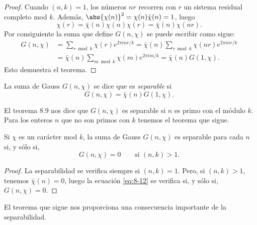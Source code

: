 \documentclass[12pt,a4paper]{book}
\begin{document}
    \begin{proof}
        Cuando $(n,k)=1$, los números $nr$ recorren con $r$ un sistema residual completo
        mod $k$. Además, $\abs{\chi(n)}^{2}=\chi(n)\bar{\chi}(n)=1$, luego
        \begin{equation*}
            \chi(r)=\bar{\chi}(n)\chi(n)\chi(r)=\bar{\chi}(n)\chi(nr).
        \end{equation*}
        Por consiguiente la suma que define $G(n,\chi)$ se puede escribir como sigue:
        \begin{align*}
            G(n,\chi)&=\sum_{r\bmod k}\chi(r)e^{2\pi inr/k}=\bar{\chi}(n)\sum_{r\bmod k}\chi(nr)e^{2\pi inr/k}\\
            &=\bar{\chi}(n)\sum_{m\bmod k}\chi(m)e^{2\pi im/k}=\bar{\chi}(n)G(1,\chi).
        \end{align*}
        Esto demuestra el teorema.
    \end{proof}

    \begin{definicion}
        La suma de Gauss $G(n,\chi)$ se dice que es \textit{separable} si
        \begin{equation}\label{eq:8-12}
            G(n,\chi)=\bar{\chi}(n)G(1,\chi).
        \end{equation}
    \end{definicion}

    El teorema 8.9 nos dice que $G(n,\chi)$ es separable si $n$ es primo con el módulo $k$.
    Para los enteros $n$ que no son primos con $k$ tenemos el teorema que sigue.

    \begin{teorema}
        Si $\chi$ es un carácter mod $k$, la suma de Gauss $G(n,\chi)$ es separable para cada
        $n$ si, y sólo si,
        \begin{equation*}
            G(n,\chi)=0\qquad\text{si }(n,k)>1.
        \end{equation*}
    \end{teorema}

    \begin{proof}
        La separabilidad se verifica siempre si $(n,k)=1$. Pero, si $(n,k)>1$, tenemos
        $\bar{\chi}(n)=0$, luego la ecuación \eqref{eq:8-12} se verifica si, y sólo si,
        $G(n,\chi)=0$.
    \end{proof}

    El teorema que sigue nos proporciona una consecuencia importante de la separabilidad.
\end{document}
